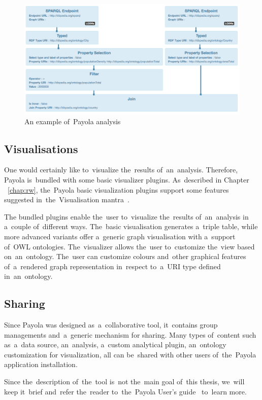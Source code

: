 \begin{figure}
	\centering
	\includegraphics[width=150mm]{images/example-analysis.png}
	\caption{An example of~Payola analysis}
	\label{fig:example-analysis}
\end{figure}

\subsection{Visualisations}
One would certainly like to~visualize the~results of~an~analysis. Therefore, 
Payola is~bundled with some basic visualizer plugins. As~described
in Chapter ~\ref{chap:rw}, the~Payola basic visualization 
plugins support some features suggested in~the~Visualisation 
mantra~\cite{mantra}.

The bundled plugins enable the~user to~visualize the~results of~an~analysis 
in a~couple of~different ways. The~basic visualisation generates a~triple 
table, while more advanced variants offer a~generic graph visualisation with a~support of~OWL ontologies. The~visualizer allows the~user to~customize the~view based on~an~ontology. The~user can customize colours and~other graphical 
features of~a~rendered graph representation in~respect to~a~URI type defined in~an~ontology.

\subsection{Sharing}
Since Payola was designed as~a~collaborative tool, it~contains group 
managements and~a~generic mechanism for sharing. Many types of~content such as~a~data source, an~analysis, a~custom analytical plugin, an~ontology customization for 
visualization, all can be~shared with other users of~the~Payola application 
installation.

Since the~description of~the~tool is~not the~main goal of~this thesis, we~will 
keep it~brief and~refer the~reader to~the~Payola User's guide~\cite{payola:ug} to~learn more.

